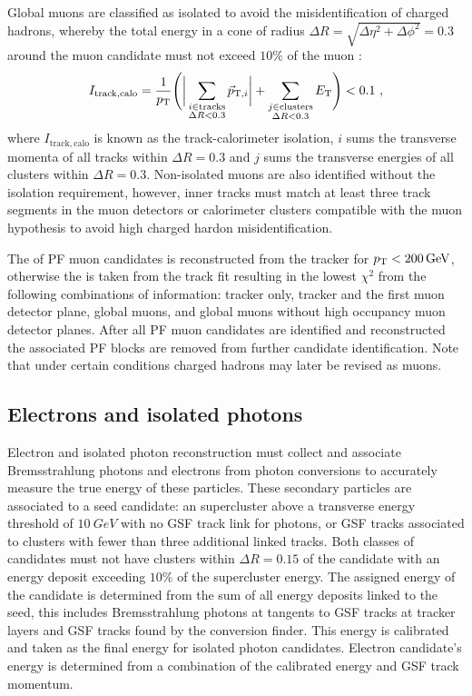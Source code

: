 Global muons are classified as isolated to avoid the misidentification of
charged hadrons, whereby the total energy in a cone of radius ${\Delta
R=\sqrt{\Delta\eta^2+\Delta\phi^2}=0.3}$ around the muon candidate must not
exceed $10\%$ of the muon \pt:
%
\begin{equation}
    I_{\mathrm{track,calo}} = \frac{1}{\pt}\Biggl(\bigg|\sum_{\substack{i\in \mathrm{tracks}\\\Delta R<0.3}} \vec{p}_{\mathrm{T},i}\bigg| + \sum_{\substack{j\in \mathrm{clusters}\\\Delta R<0.3}}E_{\mathrm{T}}\Biggr) < 0.1\ ,
\end{equation}
%
where $I_{\mathrm{track,calo}}$ is known as the track-calorimeter isolation,
$i$ sums the transverse momenta of all tracks within $\Delta R=0.3$ and $j$
sums the transverse energies of all clusters within $\Delta R=0.3$.
Non-isolated muons are also identified without the isolation requirement,
however, inner tracks must match at least three track segments in the muon
detectors or calorimeter clusters compatible with the muon hypothesis to avoid
high \pt charged hardon misidentification.

The \pt of PF muon candidates is reconstructed from the tracker for
${p_{\text{T}}<\SI{200}{GeV}}$, otherwise the \pt is taken from the track fit resulting
in the lowest $\chi^2$ from the following combinations of information: tracker
only, tracker and the first muon detector plane, global muons, and global muons
without high occupancy muon detector planes. After all PF muon candidates are
identified and reconstructed the associated PF blocks are removed from further
candidate identification. Note that under certain conditions charged hadrons
may later be revised as muons.


\subsection{Electrons and isolated photons}

Electron and isolated photon reconstruction must collect and associate
Bremsstrahlung photons and electrons from photon conversions to accurately
measure the true energy of these particles. These secondary particles are
associated to a seed candidate: an \ECAL supercluster above a transverse
energy threshold of ${\SI{10}{GeV}}$ with no GSF track link for photons, or
GSF tracks associated to \ECAL clusters with fewer than three additional
linked tracks. Both classes of candidates must not have \HCAL clusters within
${\Delta R=0.15}$ of the candidate with an energy deposit exceeding $10\%$ of
the supercluster energy. The assigned energy of the candidate is determined
from the sum of all energy deposits linked to the seed, this includes
Bremsstrahlung photons at tangents to GSF tracks at tracker layers and GSF
tracks found by the conversion finder. This energy is calibrated and taken as
the final energy for isolated photon candidates. Electron candidate's energy
is determined from a combination of the calibrated \ECAL energy and GSF track
momentum.

